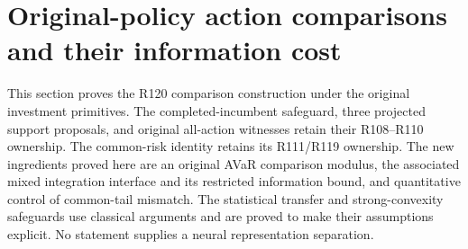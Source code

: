 \section{Original-policy action comparisons and their information cost}
\label{supp:improvement120}

This section proves the R120 comparison construction under the original
investment primitives.  The completed-incumbent safeguard, three projected
support proposals, and original all-action witnesses retain their
R108--R110 ownership.  The common-risk identity retains its R111/R119
ownership.  The new ingredients proved here are an original AVaR
comparison modulus, the associated mixed integration interface and its
restricted information bound, and quantitative control of common-tail
mismatch.  The statistical transfer and strong-convexity safeguards use
classical arguments and are proved to make their assumptions explicit.
No statement supplies a neural representation separation.

